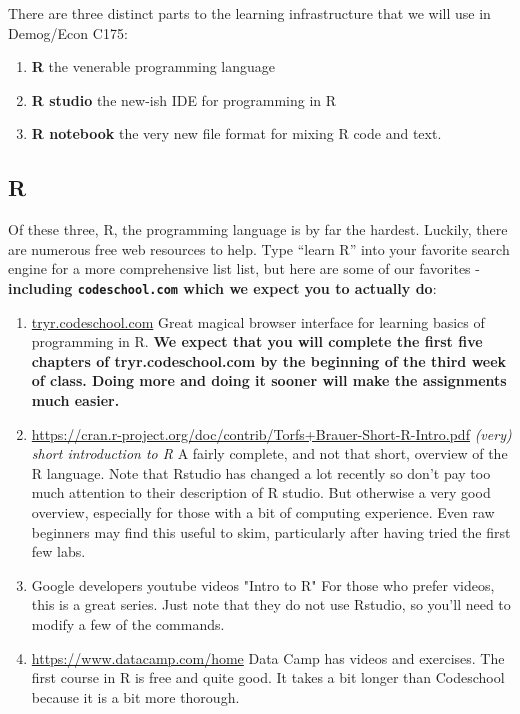 \documentclass[11pt]{article}
\begin{document}
There are three distinct parts to the learning infrastructure that we will use in Demog/Econ C175: 
\begin{enumerate}
\item \textbf{R} the venerable programming language
\item \textbf{R studio} the new-ish IDE for programming in R
\item \textbf{R notebook} the very new file format for mixing R code and text.
\end{enumerate}


\subsection{R}
\label{sec:R}

Of these three, R, the programming language is by far the hardest. Luckily, there are numerous free web resources to help.
Type ``learn R'' into your favorite search engine for a more comprehensive list list, but here are some of our favorites - \textbf{including \texttt{codeschool.com} which we expect you to actually do}:

\begin{enumerate}
\item\begin{minipage}[H]{1.0\linewidth}
\begin{mdframed}[backgroundcolor=blue!20]        
\url{tryr.codeschool.com}  Great magical browser interface for learning basics of  programming in R. \textbf{We expect that you will complete the first five chapters of tryr.codeschool.com by the beginning of the third week of class. Doing more and doing it sooner will make the assignments much easier.}
\end{mdframed}
\end{minipage}
\item
  \url{https://cran.r-project.org/doc/contrib/Torfs+Brauer-Short-R-Intro.pdf}
  \emph{(very) short introduction to R} A fairly complete, and not
  that short, overview of the R language. Note that Rstudio has
  changed a lot recently so don't pay too much attention to their
  description of R studio. But otherwise a very good overview,
  especially for those with a bit of computing experience. Even raw
  beginners may find this useful to skim, particularly after having
  tried the first few labs.

\item Google developers youtube videos "Intro to R"
For those who prefer videos, this is a great series. Just note that
they do not use Rstudio, so you'll need to modify a few of the
commands. 

\item \url{https://www.datacamp.com/home} Data Camp has videos and exercises. The first course in R is free and quite good.  It takes a bit longer than Codeschool because it is a bit more thorough. 





\end{enumerate}
\end{document}
